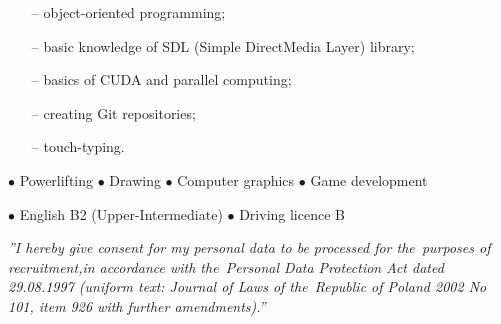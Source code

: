 \documentclass[11pt,a4paper]{article}
\begin{document}
  
    \bigskip
    \vspace{-1mm}
    \begin{itemize} \itemsep2pt \parskip0pt 
        \item[--] object-oriented programming;
        \item[--] basic knowledge of SDL (Simple DirectMedia Layer) library;
        \item[--] basics of CUDA and parallel computing;
        \item[--] creating Git repositories;
        \item[--] touch-typing.
    \end{itemize}
  
  
    \vspace{0.3cm}
  
    \medskip
    \centerline{
        \hfill
        $\bullet$ Powerlifting
        \hfill
        $\bullet$ Drawing
        \hfill
        $\bullet$ Computer graphics
        \hfill
        $\bullet$ Game development
        \hfill
    }
  
  
    \vspace{0.5cm}
  
    \medskip
    \centerline{
        \hfill
        $\bullet$ English B2 (Upper-Intermediate)
        \hfill
        $\bullet$ Driving licence B
        \hfill
    }
  
  
    \vspace{0.92cm}
    \noindent \textit{''I hereby give consent for my personal data to be processed for the~purposes
    of recruitment,\linebreak in accordance with the~Personal Data Protection Act dated 29.08.1997
    (uniform text: Journal of Laws of the~Republic of Poland 2002 No 101, item 926
    with further amendments).''}
\end{document}
